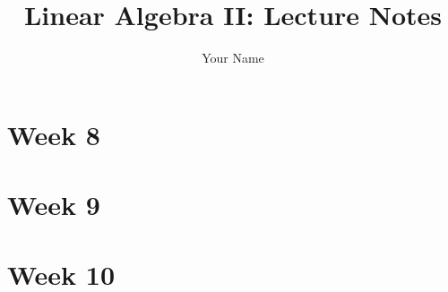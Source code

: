 \documentclass{report}
\renewcommand{\maketitle}{}
\begin{document}
\title{Linear Algebra II: Lecture Notes}
\author{Your Name}
\maketitle

\tableofcontents

\chapter{Week 8}


\chapter{Week 9}


\chapter{Week 10}

\end{document}
